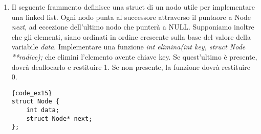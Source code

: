 \begin{enumerate}
\begin{minipage}{.45\textwidth}
\begin{lstlisting}{code_ex14}
#include <stdio.h>
int main(void) {
    int a = 5, b = 2;
    float division =  a / b;
    printf("%.3f", division);
    return 0;
}
\end{lstlisting}
\end{minipage}\hfill
\begin{minipage}[t]{.45\textwidth}
\end{minipage}


\vspace{1.4cm}
\item {} Il seguente frammento definisce una struct di un nodo utile per implementare una linked list. Ogni nodo punta al successore attraverso il puntaore a Node \emph{next}, ad eccezione dell'ultimo nodo che punterà a NULL. Supponiamo inoltre che gli elementi, siano ordinati in ordine crescente sulla base del valore della variabile \emph{data}. 
Implementare una funzione \emph{int elimina(int key, struct Node **radice);} che elimini l'elemento avente chiave key. Se quest'ultimo è presente, dovrà deallocarlo e restituire 1. Se non presente, la funzione dovrà restituire 0.

\begin{minipage}{.45\textwidth}
\begin{lstlisting}{code_ex15}
struct Node { 
    int data; 
    struct Node* next; 
}; 
\end{lstlisting}
\end{minipage}\hfill
\begin{minipage}[t]{.45\textwidth}
\end{minipage}



\end{enumerate}
